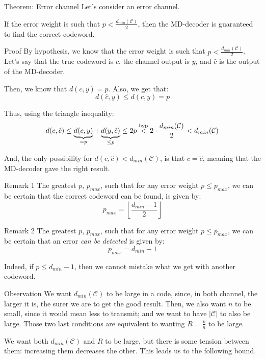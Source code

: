 \documentclass[a4paper]{article}
\begin{document}
\begin{parag}{Theorem: Error channel}
    Let's consider an error channel.

    If the error weight is such that $p < \frac{d_{min}\left(\mathcal{C}\right)}{2}$, then the MD-decoder is guaranteed to find the correct codeword.

    \begin{subparag}{Proof}
        By hypothesis, we know that the error weight is such that $p < \frac{d_{min}\left(\mathcal{C}\right)}{2}$. Let's say that the true codeword is $c$, the channel output is $y$, and $\hat{c}$ is the output of the MD-decoder.

        Then, we know that $d\left(c, y\right) = p$. Also, we get that:
        \[d\left(\hat{c}, y\right) \leq d\left(c, y\right) = p\]

        Thus, using the triangle inequality:
        \[d\left(c, \hat{c}\right) \leq \underbrace{d\left(c, y\right)}_{= p} + \underbrace{d\left(y, \hat{c}\right)}_{\leq p} \leq 2p \over{<}{hyp} 2\cdot \frac{d_{min}\left(\mathcal{C}\right)}{2} < d_{min}\left(\mathcal{C}\right)\]

        And, the only possibility for $d\left(c, \hat{c}\right) < d_{min}\left(\mathcal{C}\right)$, is that $c = \hat{c}$, meaning that the MD-decoder gave the right result.
    \end{subparag}

    \begin{subparag}{Remark 1}
        The greatest $p$, $p_{max}$, such that for any error weight $p \leq p_{max}$, we can be certain that the correct codeword can be found, is given by: 
        \[p_{max} = \left\lfloor \frac{d_{min} - 1}{2} \right\rfloor\]
    \end{subparag}

    \begin{subparag}{Remark 2}
        The greatest $p$, $p_{max}$, such that for any error weight $p \leq p_{max}$, we can be certain that an error \textit{can be detected} is given by:
        \[p_{max} = d_{min} - 1\]

        Indeed, if $p \leq d_{min} - 1$, then we cannot mistake what we get with another codeword.
    \end{subparag}
    
\end{parag}

\begin{parag}{Observation}
    We want $d_{min}\left(\mathcal{C}\right)$ to be large in a code, since, in both channel, the larger it is, the surer we are to get the good result. Then, we also want $n$ to be small, since it would mean less to transmit; and we want to have $\left|\mathcal{C}\right|$ to also be large. Those two last conditions are equivalent to wanting $R = \frac{k}{n}$ to be large.

    We want both $d_{min}\left(\mathcal{C}\right)$ and $R$ to be large, but there is some tension between them: increasing them decreases the other. This leads us to the following bound.
\end{parag}
\end{document}
